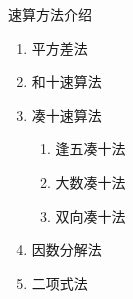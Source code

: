 \documentclass[aspectratio=169]{ctexbeamer} %
\date{\today}
\begin{document}
\begin{frame}[t]{速算方法介绍}
\begin{spacing}{1.2}
\normalsize
\begin{enumerate}[label={\arabic*.}]
\item 平方差法
\item 和十速算法
\item 凑十速算法
\begin{enumerate}[label={(\alph*)}]
\item 逢五凑十法
\item 大数凑十法
\item 双向凑十法
\end{enumerate}
\item 因数分解法
\item 二项式法

\end{enumerate}

\end{spacing}
\end{frame}
\end{document}

